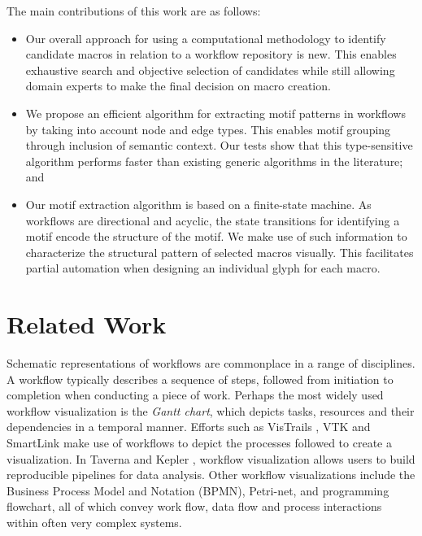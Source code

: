 The main contributions of this work are as follows:

\begin{itemize}
\vspace{-2mm}
\item Our overall approach for using a computational methodology to identify candidate macros in relation to a workflow repository is new. This enables exhaustive search and objective selection of candidates while still allowing domain experts to make the final decision on macro creation.
\vspace{-2mm}
\item We propose an efficient algorithm for extracting motif patterns in workflows by taking into account node and edge types. This enables motif grouping through inclusion of semantic context. Our tests show that this type-sensitive algorithm performs faster than existing generic algorithms in the literature; and
\vspace{-2mm}
\item
Our motif extraction algorithm is based on a finite-state machine.
As workflows are directional and acyclic, the state transitions for identifying a motif encode the structure of the motif. We make use of such information to characterize the structural pattern of selected macros visually. This facilitates partial automation when designing an individual glyph for each macro. 
\end{itemize}

\section{Related Work}
Schematic representations of workflows are commonplace in a range of disciplines.
A workflow typically describes a sequence of steps, followed from initiation to completion when conducting a piece of work.
Perhaps the most widely used workflow visualization is the \emph{Gantt chart}, which depicts tasks, resources and their dependencies in a temporal manner.
Efforts such as VisTrails \cite{callahanvistrails:2006}, VTK \cite{schroederthe1996} and SmartLink \cite{teleasmartlink:2000} make use of workflows to depict the processes followed to create a visualization.
In Taverna \cite{hull06} and Kepler \cite{altintaskepler:2004}, workflow visualization allows users to build reproducible pipelines for data analysis.  
Other workflow visualizations include the Business Process Model and Notation (BPMN), Petri-net, and programming flowchart, all of which convey work flow, data flow and process interactions within often very complex systems. 

